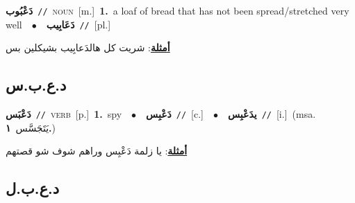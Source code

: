 \documentclass[10pt,a4paper,twoside]{article} %
\begin{document}
\begin{multicols}{2}
{\setlength\topsep{0pt}\textbf{\foreignlanguage{arabic}{دَعْبُوب}}\ {\color{gray}\texttt{//}\color{black}}\ \textsc{noun}\ [m.]\ \textbf{1.}~a loaf of bread that has not been spread/stretched very well\ \ $\bullet$\ \ \setlength\topsep{0pt}\textbf{\foreignlanguage{arabic}{دَعَابِيب}}\ {\color{gray}\texttt{//}\color{black}}\ [pl.]\  \begin{flushright}\color{gray}\foreignlanguage{arabic}{\textbf{\underline{\foreignlanguage{arabic}{أمثلة}}}: شريت كل هالدَعابِيب بشيكلين بس}\end{flushright}\color{black}} \vspace{2mm}

\vspace{-3mm}
\subsection*{\color{blue}\foreignlanguage{arabic}{د.ع.ب.س}\color{blue}{}} 

{\setlength\topsep{0pt}\textbf{\foreignlanguage{arabic}{دَعْبَس}}\ {\color{gray}\texttt{//}\color{black}}\ \textsc{verb}\ [p.]\ \textbf{1.}~spy\ \ $\bullet$\ \ \setlength\topsep{0pt}\textbf{\foreignlanguage{arabic}{دَعْبِس}}\ {\color{gray}\texttt{//}\color{black}}\ [c.]\ \ $\bullet$\ \ \setlength\topsep{0pt}\textbf{\foreignlanguage{arabic}{يدَعْبِس}}\ {\color{gray}\texttt{//}\color{black}}\ [i.]\ \color{gray}(msa. \foreignlanguage{arabic}{يَتَجَسَّس}~\foreignlanguage{arabic}{\textbf{١.}})\color{black}\  \begin{flushright}\color{gray}\foreignlanguage{arabic}{\textbf{\underline{\foreignlanguage{arabic}{أمثلة}}}: يا زلمة دَعْبِس وراهم شوف شو قصتهم}\end{flushright}\color{black}} \vspace{2mm}

\vspace{-3mm}
\subsection*{\color{blue}\foreignlanguage{arabic}{د.ع.ب.ل}\color{blue}{}} 


\end{multicols}
\end{document}
